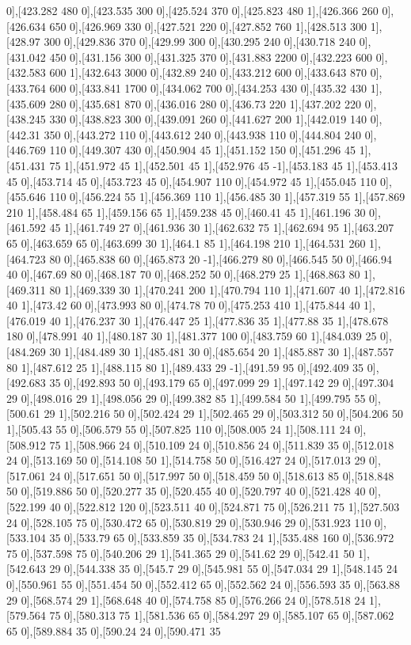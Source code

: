 {0],[423.282 480 0],[423.535 300 0],[425.524 370 0],[425.823 480 1],[426.366 260 0],[426.634 650 0],[426.969 330 0],[427.521 220 0],[427.852 760 1],[428.513 300 1],[428.97 300 0],[429.836 370 0],[429.99 300 0],[430.295 240 0],[430.718 240 0],[431.042 450 0],[431.156 300 0],[431.325 370 0],[431.883 2200 0],[432.223 600 0],[432.583 600 1],[432.643 3000 0],[432.89 240 0],[433.212 600 0],[433.643 870 0],[433.764 600 0],[433.841 1700 0],[434.062 700 0],[434.253 430 0],[435.32 430 1],[435.609 280 0],[435.681 870 0],[436.016 280 0],[436.73 220 1],[437.202 220 0],[438.245 330 0],[438.823 300 0],[439.091 260 0],[441.627 200 1],[442.019 140 0],[442.31 350 0],[443.272 110 0],[443.612 240 0],[443.938 110 0],[444.804 240 0],[446.769 110 0],[449.307 430 0],[450.904 45 1],[451.152 150 0],[451.296 45 1],[451.431 75 1],[451.972 45 1],[452.501 45 1],[452.976 45 -1],[453.183 45 1],[453.413 45 0],[453.714 45 0],[453.723 45 0],[454.907 110 0],[454.972 45 1],[455.045 110 0],[455.646 110 0],[456.224 55 1],[456.369 110 1],[456.485 30 1],[457.319 55 1],[457.869 210 1],[458.484 65 1],[459.156 65 1],[459.238 45 0],[460.41 45 1],[461.196 30 0],[461.592 45 1],[461.749 27 0],[461.936 30 1],[462.632 75 1],[462.694 95 1],[463.207 65 0],[463.659 65 0],[463.699 30 1],[464.1 85 1],[464.198 210 1],[464.531 260 1],[464.723 80 0],[465.838 60 0],[465.873 20 -1],[466.279 80 0],[466.545 50 0],[466.94 40 0],[467.69 80 0],[468.187 70 0],[468.252 50 0],[468.279 25 1],[468.863 80 1],[469.311 80 1],[469.339 30 1],[470.241 200 1],[470.794 110 1],[471.607 40 1],[472.816 40 1],[473.42 60 0],[473.993 80 0],[474.78 70 0],[475.253 410 1],[475.844 40 1],[476.019 40 1],[476.237 30 1],[476.447 25 1],[477.836 35 1],[477.88 35 1],[478.678 180 0],[478.991 40 1],[480.187 30 1],[481.377 100 0],[483.759 60 1],[484.039 25 0],[484.269 30 1],[484.489 30 1],[485.481 30 0],[485.654 20 1],[485.887 30 1],[487.557 80 1],[487.612 25 1],[488.115 80 1],[489.433 29 -1],[491.59 95 0],[492.409 35 0],[492.683 35 0],[492.893 50 0],[493.179 65 0],[497.099 29 1],[497.142 29 0],[497.304 29 0],[498.016 29 1],[498.056 29 0],[499.382 85 1],[499.584 50 1],[499.795 55 0],[500.61 29 1],[502.216 50 0],[502.424 29 1],[502.465 29 0],[503.312 50 0],[504.206 50 1],[505.43 55 0],[506.579 55 0],[507.825 110 0],[508.005 24 1],[508.111 24 0],[508.912 75 1],[508.966 24 0],[510.109 24 0],[510.856 24 0],[511.839 35 0],[512.018 24 0],[513.169 50 0],[514.108 50 1],[514.758 50 0],[516.427 24 0],[517.013 29 0],[517.061 24 0],[517.651 50 0],[517.997 50 0],[518.459 50 0],[518.613 85 0],[518.848 50 0],[519.886 50 0],[520.277 35 0],[520.455 40 0],[520.797 40 0],[521.428 40 0],[522.199 40 0],[522.812 120 0],[523.511 40 0],[524.871 75 0],[526.211 75 1],[527.503 24 0],[528.105 75 0],[530.472 65 0],[530.819 29 0],[530.946 29 0],[531.923 110 0],[533.104 35 0],[533.79 65 0],[533.859 35 0],[534.783 24 1],[535.488 160 0],[536.972 75 0],[537.598 75 0],[540.206 29 1],[541.365 29 0],[541.62 29 0],[542.41 50 1],[542.643 29 0],[544.338 35 0],[545.7 29 0],[545.981 55 0],[547.034 29 1],[548.145 24 0],[550.961 55 0],[551.454 50 0],[552.412 65 0],[552.562 24 0],[556.593 35 0],[563.88 29 0],[568.574 29 1],[568.648 40 0],[574.758 85 0],[576.266 24 0],[578.518 24 1],[579.564 75 0],[580.313 75 1],[581.536 65 0],[584.297 29 0],[585.107 65 0],[587.062 65 0],[589.884 35 0],[590.24 24 0],[590.471 35 }
